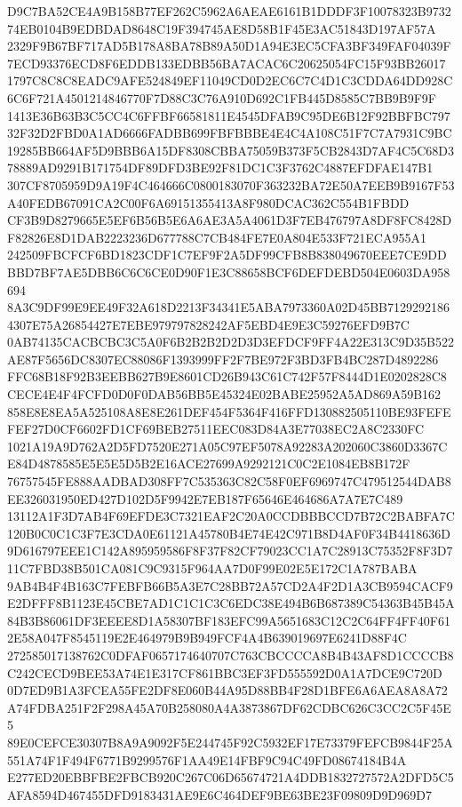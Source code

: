 \documentclass[UTF8,fontset=fandol,zihao=-4,a4paper]{ctexart}
\begin{document}
{{D9C7BA52CE4A9B158B77EF262C5962A6AEAE6161B1DDDF3F10078323B973274EB0104B9EDBDAD8648C19F394745AE8D58B1F45E3AC51843D197AF57A
2329F9B67BF717AD5B178A8BA78B89A50D1A94E3EC5CFA3BF349FAF04039F7ECD93376ECD8F6EDDB133EDBB56BA7ACAC6C20625054FC15F93BB26017
1797C8C8C8EADC9AFE524849EF11049CD0D2EC6C7C4D1C3CDDA64DD928C6C6F721A4501214846770F7D88C3C76A910D692C1FB445D8585C7BB9B9F9F
1413E36B63B3C5CC4C6FFBF66581811E4545DFAB9C95DE6B12F92BBFBC79732F32D2FBD0A1AD6666FADBB699FBFBBBE4E4C4A108C51F7C7A7931C9BC
19285BB664AF5D9BBB6A15DF8308CBBA75059B373F5CB2843D7AF4C5C68D378889AD9291B171754DF89DFD3BE92F81DC1C3F3762C4887EFDFAE147B1
307CF8705959D9A19F4C464666C0800183070F363232BA72E50A7EEB9B9167F53A40FEDB67091CA2C00F6A69151355413A8F980DCAC362C554B1FBDD
CF3B9D8279665E5EF6B56B5E6A6AE3A5A4061D3F7EB476797A8DF8FC8428DF82826E8D1DAB2223236D677788C7CB484FE7E0A804E533F721ECA955A1
242509FBCFCF6BD1823CDF1C7EF9F2A5DF99CFB8B838049670EEE7CE9DDBBD7BF7AE5DBB6C6C6CE0D90F1E3C88658BCF6DEFDEBD504E0603DA958694
8A3C9DF99E9EE49F32A618D2213F34341E5ABA7973360A02D45BB71292921864307E75A26854427E7EBE979797828242AF5EBD4E9E3C59276EFD9B7C
0AB74135CACBCBC3C5A0F6B2B2B2D2D3D3EFDCF9FF4A22E313C9D35B522AE87F5656DC8307EC88086F1393999FF2F7BE972F3BD3FB4BC287D4892286
FFC68B18F92B3EEBB627B9E8601CD26B943C61C742F57F8444D1E0202828C8CECE4E4F4FCFD0D0F0DAB56BB5E45324E02BABE25952A5AD869A59B162
858E8E8EA5A525108A8E8E261DEF454F5364F416FFD130882505110BE93FEFEFEF27D0CF6602FD1CF69BEB27511EEC083D84A3E77038EC2A8C2330FC
1021A19A9D762A2D5FD7520E271A05C97EF5078A92283A202060C3860D3367CE84D4878585E5E5E5D5B2E16ACE27699A9292121C0C2E1084EB8B172F
76757545FE888AADBAD308FF7C535363C82C58F0EF6969747C479512544DAB8EE326031950ED427D102D5F9942E7EB187F65646E464686A7A7E7C489
13112A1F3D7AB4F69EFDE3C7321EAF2C20A0CCDBBBCCD7B72C2BABFA7C120B0C0C1C3F7E3CDA0E61121A45780B4E74E42C971B8D4AF0F34B4418636D
9D616797EEE1C142A895959586F8F37F82CF79023CC1A7C28913C75352F8F3D711C7FBD38B501CA081C9C9315F964AA7D0F99E02E5E172C1A787BABA
9AB4B4F4B163C7FEBFB66B5A3E7C28BB72A57CD2A4F2D1A3CB9594CACF9E2DFFF8B1123E45CBE7AD1C1C1C3C6EDC38E494B6B687389C54363B45B45A
84B3B86061DF3EEEE8D1A58307BF183EFC99A5651683C12C2C64FF4FF40F612E58A047F8545119E2E464979B9B949FCF4A4B639019697E6241D88F4C
272585017138762C0DFAF0657174640707C763CBCCCCA8B4B43AF8D1CCCCB8C242CECD9BEE53A74E1E317CF861BBC3EF3FD555592D0A1A7DCE9C720D
0D7ED9B1A3FCEA55FE2DF8E060B44A95D88BB4F28D1BFE6A6AEA8A8A72A74FDBA251F2F298A45A70B258080A4A3873867DF62CDBC626C3CC2C5F45E5
89E0CEFCE30307B8A9A9092F5E244745F92C5932EF17E73379FEFCB9844F25A551A74F1F494F6771B9299576F1AA49E14FBF9C94C49FD08674184B4A
E277ED20EBBFBE2FBCB920C267C06D65674721A4DDB1832727572A2DFD5C5AFA8594D467455DFD9183431AE9E6C464DEF9BE63BE23F09809D9D969D7
}}
\end{document}
